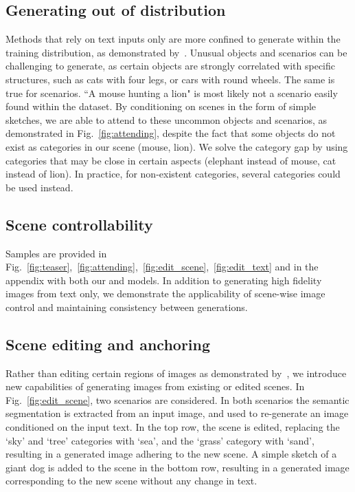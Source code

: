 \documentclass[final]{cvpr}
\begin{document}
\subsection{Generating out of distribution}
Methods that rely on text inputs only are more confined to generate within the training distribution, as demonstrated by~\cite{nichol2021glide}. Unusual objects and scenarios can be challenging to generate, as certain objects are strongly correlated with specific structures, such as cats with four legs, or cars with round wheels. The same is true for scenarios. ``A mouse hunting a lion" is most likely not a scenario easily found within the dataset. By conditioning on scenes in the form of simple sketches, we are able to attend to these uncommon objects and scenarios, as demonstrated in Fig.~\ref{fig:attending}, despite the fact that some objects do not exist as categories in our scene (mouse, lion). We solve the category gap by using categories that may be close in certain aspects (elephant instead of mouse, cat instead of lion). In practice, for non-existent categories, several categories could be used instead.

\subsection{Scene controllability}
Samples are provided in Fig.~\ref{fig:teaser},~\ref{fig:attending},~\ref{fig:edit_scene},~\ref{fig:edit_text} and in the appendix with both our  and  models. In addition to generating high fidelity images from text only, we demonstrate the applicability of scene-wise image control and maintaining consistency between generations.

\subsection{Scene editing and anchoring} 
Rather than editing certain regions of images as demonstrated by~\cite{ramesh2021zero}, we introduce new capabilities of generating images from existing or edited scenes. In Fig.~\ref{fig:edit_scene}, two scenarios are considered. In both scenarios the semantic segmentation is extracted from an input image, and used to re-generate an image conditioned on the input text. In the top row, the scene is edited, replacing the `sky' and `tree' categories with `sea', and the `grass' category with `sand', resulting in a generated image adhering to the new scene. A simple sketch of a giant dog is added to the scene in the bottom row, resulting in a generated image corresponding to the new scene without any change in text.
\end{document}
